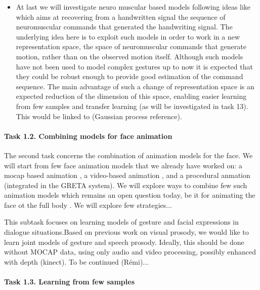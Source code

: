\begin{itemize}
  \item At last we will investigate neuro muscular based models following ideas like \cite{O'Reilly et al., 2012} which aims at recovering from a handwritten signal the sequence of neuromuscular commands that generated the handwriting signal. The underlying idea here is to exploit such models in order to work in a new representation space, the space of neuromuscular commands that generate motion, rather than on the observed motion itself. 
  Although such models have not been used to model complex gestures up to now it is expected that they could be robust enough to provide good estimation of the command sequence. The main advantage of such a change of representation space is an expected reduction of the dimension of this space, enabling easier learning from few samples and transfer learning (as will be investigated in task 13). This would be linked to (Gaussian process reference).

\end{itemize}


\paragraph{Task 1.2. Combining models for face animation } 

The second task concerns the combination of animation models for the face. We will start from few face animation models that we already have worked on: a mocap based animation \cite{These Yu}, a video-based animation \cite{TheseINRIA}, and a procedural anmation \cite{XX} (integrated in the GRETA system). 
We will explore ways to combine few such animation models which remains an open question today, be it for animating the face ot the full body \cite{...}. We will explore few strategies...



This subtask focuses on learning models of gesture and facial expressions in dialogue situations.Based on previous work on  visual prosody, we would like to learn joint models of gesture and  speech prosody. Ideally, this should be done without MOCAP data, using only audio and video processing, possibly enhanced with depth (kinect). To be continued (Rémi)...

\paragraph{Task 1.3. Learning from few samples}

